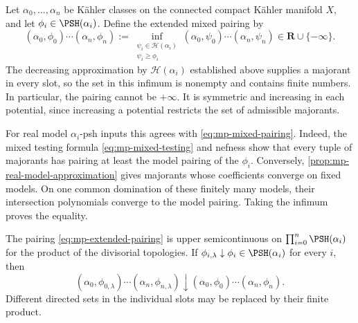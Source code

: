 Let $\alpha_0,\ldots,\alpha_n$ be K\"ahler classes on the connected compact K\"ahler manifold $X$, and let $\phi_i\in\PSH(\alpha_i)$. Define the extended mixed pairing by
\[
 (\alpha_0,\phi_0)\cdots(\alpha_n,\phi_n)
 :=\inf_{\substack{\psi_i\in\mathcal H(\alpha_i)\\
                    \psi_i\geq\phi_i}}
       (\alpha_0,\psi_0)\cdots(\alpha_n,\psi_n)
 \in\mathbf R\cup\{-\infty\}.
\tag{60.18}\label{eq:mp-extended-pairing}
\]
The decreasing approximation by $\mathcal H(\alpha_i)$ established above supplies a majorant in every slot, so the set in this infimum is nonempty and contains finite numbers. In particular, the pairing cannot be $+\infty$. It is symmetric and increasing in each potential, since increasing a potential restricts the set of admissible majorants.

For real model $\alpha_i$-psh inputs this agrees with \eqref{eq:mp-mixed-pairing}. Indeed, the mixed testing formula \eqref{eq:mp-mixed-testing} and nefness show that every tuple of majorants has pairing at least the model pairing of the $\phi_i$. Conversely, \cref{prop:mp-real-model-approximation} gives majorants whose coefficients converge on fixed models. On one common domination of these finitely many models, their intersection polynomials converge to the model pairing. Taking the infimum proves the equality.

\begin{proposition}\label{prop:mp-extended-pairing-continuity}
The pairing \eqref{eq:mp-extended-pairing} is upper semicontinuous on $\prod_{i=0}^n\PSH(\alpha_i)$ for the product of the divisorial topologies. If $\phi_{i,\lambda}\downarrow\phi_i\in\PSH(\alpha_i)$ for every $i$, then
\[
 (\alpha_0,\phi_{0,\lambda})\cdots(\alpha_n,\phi_{n,\lambda})
 \downarrow(\alpha_0,\phi_0)\cdots(\alpha_n,\phi_n).
\tag{60.18a}\label{eq:mp-extended-pairing-decreasing}
\]
Different directed sets in the individual slots may be replaced by their finite product.
\end{proposition}

